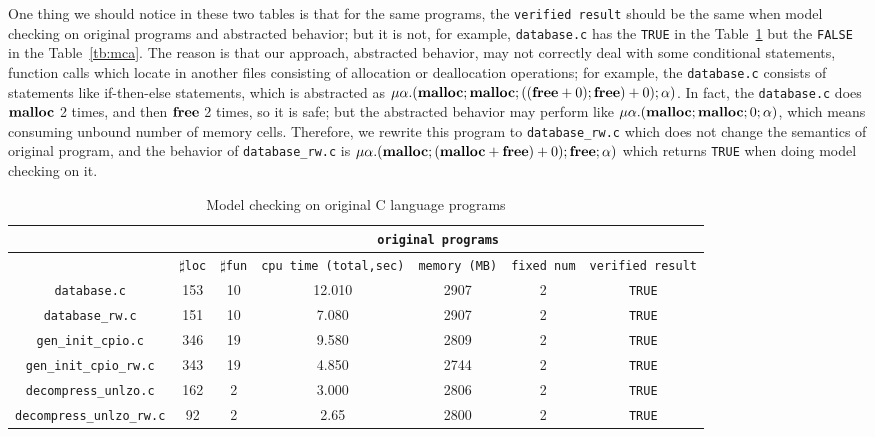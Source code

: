 One thing we should notice in these two tables is that for the same
programs, the \texttt{verified result} should be the same when model
checking on original programs and abstracted behavior; but it is not,
for example, \texttt{database.c} has the \texttt{TRUE} in the
Table~\ref{tb:mcc} but the \texttt{FALSE} in the
Table~\ref{tb:mca}. The reason is that our approach, abstracted
behavior, may not correctly deal with some conditional statements,
function calls which locate in another files consisting of allocation
or deallocation operations; for example, the \texttt{database.c}
consists of statements like if-then-else statements, which is
abstracted as $\mu\alpha.(\mathbf{malloc};\mathbf{malloc};((\mathbf{free} + 0);\mathbf{free}) +
0);\alpha)$. In fact, the \texttt{database.c} does $\mathbf{malloc}$ 2 times,
and then $\mathbf{free}$ 2 times, so it is safe; but the abstracted behavior
may perform like $\mu\alpha.(\mathbf{malloc};\mathbf{malloc};0;\alpha)$, which means
consuming unbound number of memory cells. Therefore, we rewrite this
program to \texttt{database\_rw.c} which does not change the semantics
of original program, and the behavior of \texttt{database\_rw.c} is
$\mu\alpha.(\mathbf{malloc};(\mathbf{malloc} + \mathbf{free}) + 0);\mathbf{free};\alpha)$ which
returns \texttt{TRUE} when doing model checking on it.

\begin{table}
  \scriptsize
\begin{tabular}{|c|c|c|c|c|c|c|}
\hline
& \multicolumn{6}{|c|}{\texttt{original programs}}  \\
\hline
 & $\sharp$\texttt{loc} & $\sharp$\texttt{fun} & \texttt{cpu time (total,sec)} & \texttt{memory (MB)} & \texttt{fixed num}& \texttt{verified result} \\
\hline
\texttt{database.c} & 153 & 10 & 12.010 & 2907 & 2  & \texttt{TRUE}  \\
\hline
\texttt{database\_rw.c} & 151 & 10 & 7.080 & 2907 & 2  & \texttt{TRUE}  \\
\hline
\texttt{gen\_init\_cpio.c} & 346 & 19 & 9.580 & 2809 & 2  & \texttt{TRUE}  \\
\hline
\texttt{gen\_init\_cpio\_rw.c} & 343 &19  & 4.850  & 2744  & 2  & \texttt{TRUE}  \\
\hline
\texttt{decompress\_unlzo.c} & 162 & 2  & 3.000  & 2806  & 2  & \texttt{TRUE}  \\
\hline
\texttt{decompress\_unlzo\_rw.c} & 92 & 2  & 2.65  & 2800  & 2  & \texttt{TRUE}  \\

\hline
\end{tabular}
\caption{Model checking on original C language programs}
\label{tb:mcc}
\end{table}

